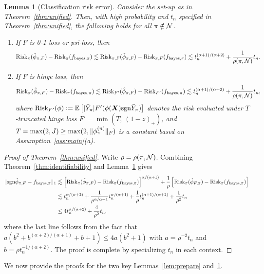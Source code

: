 \documentclass[11pt]{article}
\theoremstyle{plain}
\newtheorem{lem}{Lemma}
\theoremstyle{definition}
\def\sign{\textup{sgn}}
\def\bayespif{f_{\textup{bayes},\pi}}
\def\risk{\textup{Risk}_\pi}
\def\shift{\bar Y_\pi}
\def\riskF{\textup{Risk}_{\pi,F}}
\begin{document}
\begin{lem}[Classification risk error]\label{lem:risk}Consider the set-up as in Theorem~\ref{thm:unified}. Then, with high probability and $t_n$ specified in Theorem~\ref{thm:unified}, the following holds for all $\pi\notin\mathcal{N}$. 
\begin{enumerate}[label={2.\arabic*},wide, labelwidth=!, labelindent=0pt]
\item[(a)] If $F$ is 0-1 loss or psi-loss, then
\[
\risk(\hat \phi_{\pi,F})-\risk(\bayespif)\lesssim \riskF(\hat \phi_{\pi,F})-\riskF(\bayespif) \lesssim t_n^{(\alpha+1)/(\alpha+2)}+ {1\over \rho(\pi,\tN)}t_n.
\]
\item[(b)] If $F$ is hinge loss, then
\[
\risk(\hat \phi_{\pi,F})-\risk(\bayespif)\lesssim \textup{Risk}_{F'}(\hat \phi_{\pi,F})-\textup{Risk}_{F'}(\bayespif) \lesssim t_n^{(\alpha+1)/(\alpha+2)}+ {1\over \rho(\pi,\tN)}t_n,
\]
where $\textup{Risk}_{F'}(\phi):=\mathbb{E}\left[|\shift|F'( \phi(\mX)\sign\shift)\right]$ denotes the risk evaluated under $T$-truncated hinge loss $F'=\min(T,\ (1-z)_{+})$, and $T=\max(2,J) \geq \max(2, \lVert\phi_\pi^{(n)}\rVert_F)$ is a constant based on Assumption~\ref{ass:main}(a). 
\end{enumerate}
\end{lem}

\begin{proof}[Proof of Theorem~\ref{thm:unified}]
Write $\rho=\rho(\pi,\mathcal{N})$. Combining Theorem~\ref{thm:identifiability} and Lemma~\ref{lem:risk} gives
\begin{align}
\onenormSize{}{\sign \hat\phi_{\pi,F}-\bayespif} &\lesssim \left[\risk(\hat \phi_{\pi,F})-\risk(\bayespif)\right]^{\alpha/(\alpha+1)}+{1\over \rho}\left[\risk(\hat \phi_{F,\pi})-\risk(\bayespif)\right]\\
&\lesssim t_n^{\alpha/(\alpha+2)}+{1\over \rho^{\alpha/\alpha+1}}t_n^{\alpha/(\alpha+1)}+{1\over \rho}t_n^{(\alpha+1)/(\alpha+2)}+{1\over \rho^2}t_n\notag \\
&\leq 4t_n^{\alpha/(\alpha+2)}+{4\over \rho^2}t_n,
\end{align}
where the last line follows from the fact that $a(b^2+b^{(\alpha+2)/(\alpha+1)}+b+1) \leq 4 a (b^2+1)$ with $a=\rho^{-2}t_n$ and $b=\rho t_n^{-1/(\alpha+2)}$. The proof is complete by specializing $t_n$ in each context. 
\end{proof}

We now provide the proofs for the two key Lemmas~\ref{lem:prepare} and~\ref{lem:risk}.
\end{document}
